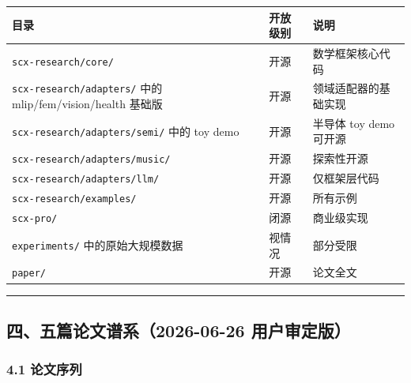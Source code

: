 \documentclass[
  12pt,
]{ctexart}
\begin{document}
\begin{longtable}[]{@{}
  >{\raggedright\arraybackslash}p{}
  >{\raggedright\arraybackslash}p{}
  >{\raggedright\arraybackslash}p{}@{}}
\toprule\noalign{}
\begin{minipage}[b]{\linewidth}\raggedright
目录
\end{minipage} & \begin{minipage}[b]{\linewidth}\raggedright
开放级别
\end{minipage} & \begin{minipage}[b]{\linewidth}\raggedright
说明
\end{minipage} \\
\midrule\noalign{}
\endhead
\bottomrule\noalign{}
\endlastfoot
\texttt{scx-research/core/} & 开源 & 数学框架核心代码 \\
\texttt{scx-research/adapters/} 中的 mlip/fem/vision/health 基础版 &
开源 & 领域适配器的基础实现 \\
\texttt{scx-research/adapters/semi/} 中的 toy demo & 开源 & 半导体 toy
demo 可开源 \\
\texttt{scx-research/adapters/music/} & 开源 & 探索性开源 \\
\texttt{scx-research/adapters/llm/} & 开源 & 仅框架层代码 \\
\texttt{scx-research/examples/} & 开源 & 所有示例 \\
\texttt{scx-pro/} & 闭源 & 商业级实现 \\
\texttt{experiments/} 中的原始大规模数据 & 视情况 & 部分受限 \\
\texttt{paper/} & 开源 & 论文全文 \\
\end{longtable}

\begin{center}\rule{0.5\linewidth}{0.5pt}\end{center}

\subsection{四、五篇论文谱系（2026-06-26
用户审定版）}\label{ux56dbux4e94ux7bc7ux8bbaux6587ux8c31ux7cfb2026-06-26-ux7528ux6237ux5ba1ux5b9aux7248}

\subsubsection{4.1 论文序列}\label{ux8bbaux6587ux5e8fux5217}
\end{document}
